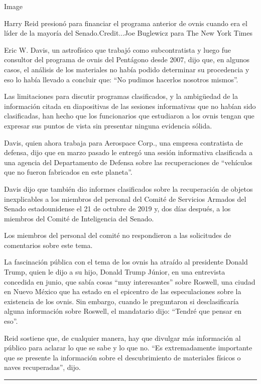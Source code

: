 Image

Harry Reid presionó para financiar el programa anterior de ovnis cuando
era el líder de la mayoría del Senado.Credit...Joe Buglewicz para The
New York Times

Eric W. Davis, un astrofísico que trabajó como subcontratista y luego
fue consultor del programa de ovnis del Pentágono desde 2007, dijo que,
en algunos casos, el análisis de los materiales no había podido
determinar su procedencia y eso lo había llevado a concluir que: ``No
pudimos hacerlos nosotros mismos''.

Las limitaciones para discutir programas clasificados, y la ambigüedad
de la información citada en diapositivas de las sesiones informativas
que no habían sido clasificadas, han hecho que los funcionarios que
estudiaron a los ovnis tengan que expresar sus puntos de vista sin
presentar ninguna evidencia sólida.

Davis, quien ahora trabaja para Aerospace Corp., una empresa contratista
de defensa, dijo que en marzo pasado le entregó una sesión informativa
clasificada a una agencia del Departamento de Defensa sobre las
recuperaciones de ``vehículos que no fueron fabricados en este
planeta''.

Davis dijo que también dio informes clasificados sobre la recuperación
de objetos inexplicables a los miembros del personal del Comité de
Servicios Armados del Senado estadounidense el 21 de octubre de 2019 y,
dos días después, a los miembros del Comité de Inteligencia del Senado.

Los miembros del personal del comité no respondieron a las solicitudes
de comentarios sobre este tema.

La fascinación pública con el tema de los ovnis ha atraído al presidente
Donald Trump, quien le dijo a su hijo, Donald Trump Júnior, en una
entrevista concedida en junio, que sabía cosas ``muy interesantes''
sobre Roswell, una ciudad en Nuevo México que ha estado en el epicentro
de las especulaciones sobre la existencia de los ovnis. Sin embargo,
cuando le preguntaron si desclasificaría alguna información sobre
Roswell, el mandatario dijo: ``Tendré que pensar en eso''.

Reid sostiene que, de cualquier manera, hay que divulgar más información
al público para aclarar lo que se sabe y lo que no. ``Es extremadamente
importante que se presente la información sobre el descubrimiento de
materiales físicos o naves recuperadas'', dijo.

\begin{center}\rule{0.5\linewidth}{\linethickness}\end{center}

